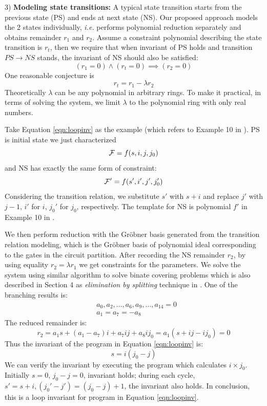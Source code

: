 3) {\bf Modeling state transitions:}
A typical state transition starts from the previous state (PS) and ends at next state (NS). 
Our proposed approach models the 2 states individually,
{\it i.e.} performs polynomial reduction separately and obtains remainder $r_1$ and $r_2$. 
Assume a constraint polynomial describing
the state transition is $r_t$, then we require that when invariant of PS holds and transition $PS \to NS$ stands,
the invariant of NS should also be satisfied:
$$(r_1 = 0)\land (r_t = 0) \implies (r_2 = 0)$$
One reasonable conjecture is
$$r_t = r_1 - \lambda r_2$$
Theoretically $\lambda$ can be any polynomial in arbitrary rings. To make it practical, in terms of solving the system, 
we limit $\lambda$ to the polynomial ring with only real numbers.

Take Equation \ref{eqn:loopinv} as the example (which refers to Example 10 in \cite{sankaranarayanan2004non}). 
PS is initial state we just characterized 
$${\mathcal{F}} = f(s,i,j,j_0)$$ 
and NS has exactly the same form of constraint:
$${\mathcal{F}}' = f(s',i',j',j_0')$$
Considering the transition relation, we substitute $s'$ with $s+i$ and replace $j'$
with $j-1$, $i'$ for $i$, $j_0'$ for $j_0$, respectively. 
The template for NS is polynomial $f'$ in Example 10 in \cite{sankaranarayanan2004non}.

We then perform reduction with the Gr\"obner basis generated from the transition relation modeling, 
which is the Gr\"obner basis of polynomial ideal corresponding to the gates in the circuit partition.
After recording the NS remainder $r_2$,
by using equality $r_2 = \lambda r_1$ we get constraints for the parameters. We solve the system using 
similar algorithm to solve binate covering problems
which is also described in Section 4 as \emph{elimination by splitting} technique in \cite{sankaranarayanan2004non}. 
One of the branching results is:
\begin{align*}
&a_0,a_2,\dots, a_6, a_9,\dots,a_{14}=  0\\ 
&a_1=a_7=-a_8
\end{align*}
The reduced remainder is: 
$$r_2 = a_1s +(a_1-a_7)i+a_7ij+a_8ij_0 = a_1(s+ij-ij_0) = 0$$
Thus the invariant of the program in Equation \ref{eqn:loopinv} is:
$$s = i(j_0- j)$$
We can verify the invariant by executing the program which calculates $i\times j_0$. 
Initially $s=0$, $j_0-j=0$, invariant holds;
during each cycle, $s'=s+i, (j_0'-j') = (j_0-j)+1$, the invariant also holds. In conclusion, this is a
loop invariant for program in Equation \ref{eqn:loopinv}.

